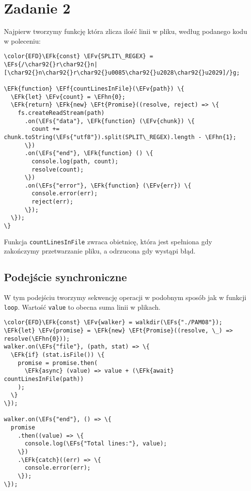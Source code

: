 \documentclass[11pt]{article}
\newcommand{\EFs}[1]{\textcolor{EFs}{#1}} %
\newcommand{\EFk}[1]{\textcolor{EFk}{#1}} %
\newcommand{\EFf}[1]{\textcolor{EFf}{#1}} %
\newcommand{\EFv}[1]{\textcolor{EFv}{#1}} %
\newcommand{\EFt}[1]{\textcolor{EFt}{#1}} %
\newcommand{\EFhn}[1]{\textcolor{EFhn}{#1}} %
\begin{document}
\section*{Zadanie 2}
\label{sec:orgdc55603}
Najpierw tworzymy funkcję która zlicza ilość linii w pliku, według podanego kodu w poleceniu:
\begin{Code}
\begin{Verbatim}
\color{EFD}\EFk{const} \EFv{SPLIT\_REGEX} = \EFs{/\char92{}r\char92{}n|[\char92{}n\char92{}r\char92{}u0085\char92{}u2028\char92{}u2029]/}g;

\EFk{function} \EFf{countLinesInFile}(\EFv{path}) \{
  \EFk{let} \EFv{count} = \EFhn{0};
  \EFk{return} \EFk{new} \EFt{Promise}((resolve, reject) => \{
    fs.createReadStream(path)
      .on(\EFs{"data"}, \EFk{function} (\EFv{chunk}) \{
        count += chunk.toString(\EFs{"utf8"}).split(SPLIT\_REGEX).length - \EFhn{1};
      \})
      .on(\EFs{"end"}, \EFk{function} () \{
        console.log(path, count);
        resolve(count);
      \})
      .on(\EFs{"error"}, \EFk{function} (\EFv{err}) \{
        console.error(err);
        reject(err);
      \});
  \});
\}
\end{Verbatim}
\end{Code}

Funkcja \texttt{countLinesInFile} zwraca obietnicę, która jest spełniona gdy zakończymy
przetwarzanie pliku, a odrzucona gdy wystąpi błąd.
\subsection*{Podejście synchroniczne}
\label{sec:orgb47d467}
W tym podejściu tworzymy sekwencję operacji w podobnym sposób jak w funkcji
\texttt{loop}. Wartość \texttt{value} to obecna suma linii w plikach.

\begin{Code}
\begin{Verbatim}
\color{EFD}\EFk{const} \EFv{walker} = walkdir(\EFs{"./PAM08"});
\EFk{let} \EFv{promise} = \EFk{new} \EFt{Promise}((resolve, \_) => resolve(\EFhn{0}));
walker.on(\EFs{"file"}, (path, stat) => \{
  \EFk{if} (stat.isFile()) \{
    promise = promise.then(
      \EFk{async} (value) => value + (\EFk{await} countLinesInFile(path))
    );
  \}
\});

walker.on(\EFs{"end"}, () => \{
  promise
    .then((value) => \{
      console.log(\EFs{"Total lines:"}, value);
    \})
    .\EFk{catch}((err) => \{
      console.error(err);
    \});
\});
\end{Verbatim}
\end{Code}
\end{document}
